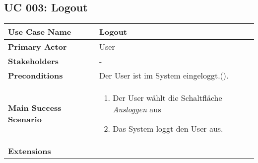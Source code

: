 \subsection{UC 003: Logout}
\label{uc:003-logout}

\begin{tabular}{|l|p{}|}
\hline
\textbf{Use Case Name} 	&	Logout	\\ \hline
\textbf{Primary Actor} 	&	User	\\ \hline
\textbf{Stakeholders}	&	-	\\ \hline
\textbf{Preconditions}	&	Der User ist im System eingeloggt.(\nameref{uc:002-login}).	\\ \hline
\textbf{Main Success Scenario}	& 	
\begin{enumerate}
	\item Der User wählt die Schaltfläche \emph{Ausloggen} aus
	\item Das System loggt den User aus.
\end{enumerate}
\\ \hline
\textbf{Extensions}	& 	\\ \hline
\end{tabular}